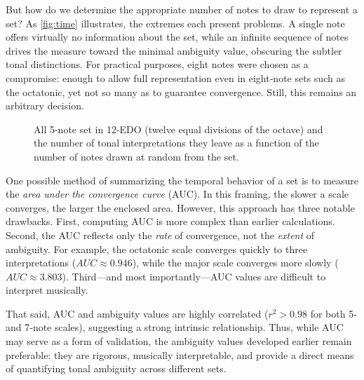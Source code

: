 \documentclass[10pt,twocolumn]{article}
\numberwithin{equation}{section} %
\begin{document}
    But how do we determine the appropriate number of notes to draw to represent a set?
    As \autoref{fig:time} illustrates, the extremes each present problems.
    A single note offers virtually no information about the set, while an infinite sequence of notes drives the measure toward the minimal ambiguity value, obscuring the subtler tonal distinctions.
    For practical purposes, eight notes were chosen as a compromise: enough to allow full representation even in eight‑note sets such as the octatonic, yet not so many as to guarantee convergence.
    Still, this remains an arbitrary decision.

    \begin{figure}[htbp]
        \centering
        \caption{All 5-note set in 12-EDO (twelve equal divisions of the octave) and the number of tonal interpretations they leave as a function of the number of notes drawn at random from the set.}
        \label{fig:time}
    \end{figure}

    One possible method of summarizing the temporal behavior of a set is to measure the \textit{area under the convergence curve} (AUC).
    In this framing, the slower a scale converges, the larger the enclosed area.
    However, this approach has three notable drawbacks.
    First, computing AUC is more complex than earlier calculations.
    Second, the AUC reflects only the \textit{rate} of convergence, not the \textit{extent} of ambiguity.
    For example, the octatonic scale converges quickly to three interpretations ($AUC \approx 0.946$), while the major scale converges more slowly ($AUC \approx 3.803$).
    Third—and most importantly—AUC values are difficult to interpret musically.

    That said, AUC and ambiguity values are highly correlated ($r^2 > 0.98$ for both 5‑ and 7‑note scales), suggesting a strong intrinsic relationship.
    Thus, while AUC may serve as a form of validation, the ambiguity values developed earlier remain preferable: they are rigorous, musically interpretable, and provide a direct means of quantifying tonal ambiguity across different sets.
\end{document}
